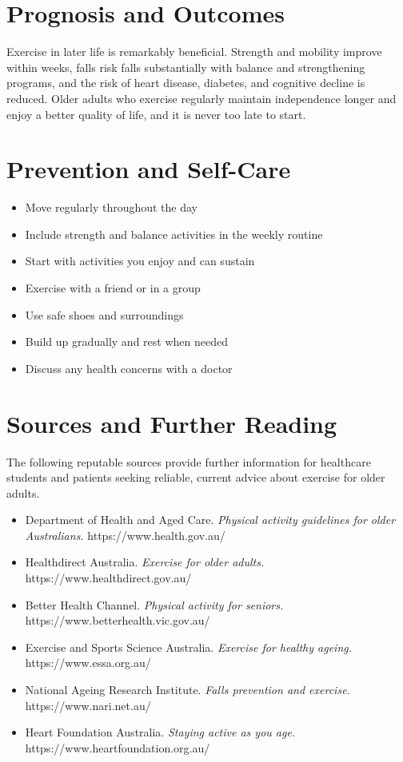 \section*{Prognosis and Outcomes}
Exercise in later life is remarkably beneficial. Strength and mobility improve within weeks, falls risk falls substantially with balance and strengthening programs, and the risk of heart disease, diabetes, and cognitive decline is reduced. Older adults who exercise regularly maintain independence longer and enjoy a better quality of life, and it is never too late to start.

\section*{Prevention and Self-Care}
\begin{itemize}
    \item Move regularly throughout the day
    \item Include strength and balance activities in the weekly routine
    \item Start with activities you enjoy and can sustain
    \item Exercise with a friend or in a group
    \item Use safe shoes and surroundings
    \item Build up gradually and rest when needed
    \item Discuss any health concerns with a doctor
\end{itemize}

\section*{Sources and Further Reading}
The following reputable sources provide further information for healthcare students and patients seeking reliable, current advice about exercise for older adults.
\begin{itemize}
    \item Department of Health and Aged Care. \textit{Physical activity guidelines for older Australians.} https://www.health.gov.au/
    \item Healthdirect Australia. \textit{Exercise for older adults.} https://www.healthdirect.gov.au/
    \item Better Health Channel. \textit{Physical activity for seniors.} https://www.betterhealth.vic.gov.au/
    \item Exercise and Sports Science Australia. \textit{Exercise for healthy ageing.} https://www.essa.org.au/
    \item National Ageing Research Institute. \textit{Falls prevention and exercise.} https://www.nari.net.au/
    \item Heart Foundation Australia. \textit{Staying active as you age.} https://www.heartfoundation.org.au/
\end{itemize}
